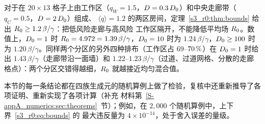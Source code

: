 对于在 $20\times13$ 格子上由工作区（$q_W=1.5$，$D=0.3\,D_0$）和中央走廊带（$q_C=0.5$，$D=2\,D_0$）组成、
$\langle q\rangle=1.2$ 的两区房间，定理~\ref{s3_r0:thm:bounds} 给出 $R_0\ge1.2\,\beta/\gamma$：把低风险走廊与高风险
工作区隔开，不能降低平均场 $R_0$。数值上，$D_0=1$ 时 $R_0=4.972=1.39\,\beta/\gamma$，$D_0=10$ 时为
$1.24\,\beta/\gamma$，$D_0\ge100$ 时为 $1.20\,\beta/\gamma$。同样两个分区的另外四种排布（工作区占 $69$--$70\,\%$）在
$D_0=1$ 时给出 $1.43\,\beta/\gamma$（走廊带沿一面墙）和 $1.22$--$1.23\,\beta/\gamma$（过道、过道网格、分散的走廊
格点）：两个分区交错得越细，$R_0$ 就越接近均匀混合值。

本节的每一条结论都在四族生成元的随机算例上做了检验，复核中还重新推导了各项证明、重新实现了各项计算（补充
材料第~\ref{S-appA_numerics:sec:theorems}~节）；例如，在 $2{,}000$ 个随机算例中，上下界~\eqref{s3_r0:eq:bounds} 的
最大违反量为 $4\times10^{-14}$，处于舍入误差的量级。
